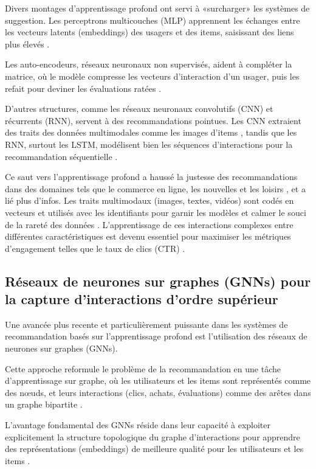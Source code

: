 Divers montages d'apprentissage profond ont servi à «surcharger» les systèmes de suggestion. Les perceptrons multicouches (MLP) apprennent les échanges entre les vecteurs latents (embeddings) des usagers et des items, saisissant des liens plus élevés \citet{He2017}.

Les auto-encodeurs, réseaux neuronaux non supervisés, aident à compléter la matrice, où le modèle compresse les vecteurs d'interaction d'un usager, puis les refait pour deviner les évaluations ratées \citep{Sedhain2015}.

D'autres structures, comme les réseaux neuronaux convolutifs (CNN) et récurrents (RNN), servent à des recommandations pointues. Les CNN extraient des traits des données multimodales comme les images d'items \citep{Wang2017a}, tandis que les RNN, surtout les LSTM, modélisent bien les séquences d'interactions pour la recommandation séquentielle \citep{Hidasi2016}. 

Ce saut vers l'apprentissage profond a haussé la justesse des recommandations dans des domaines tels que le commerce en ligne, les nouvelles et les loisirs \citep{Covington2016, Okura2017}, et a lié plus d'infos. Les traits multimodaux (images, textes, vidéos) sont codés en vecteurs et utilisés avec les identifiants pour garnir les modèles et calmer le souci de la rareté des données \citep{Zhang2017, Elkahky2015}. L'apprentissage de ces interactions complexes entre différentes caractéristiques est devenu essentiel pour maximiser les métriques d'engagement telles que le taux de clics (CTR) \citep{Guo2017}.
\subsection{Réseaux de neurones sur graphes (GNNs) pour la capture d'interactions d'ordre supérieur}

Une avancée plus recente et particulièrement puissante dans les systèmes de recommandation basés sur l'apprentissage profond est l'utilisation des réseaux de neurones sur graphes (GNNs).

Cette approche reformule le problème de la recommandation en une tâche d'apprentissage sur graphe, où les utilisateurs et les items sont représentés comme des nœuds, et leurs interactions (clics, achats, évaluations) comme des arêtes dans un graphe bipartite \citep{Ying2018, Wang2019}. 

L'avantage fondamental des GNNs réside dans leur capacité à exploiter explicitement la structure topologique du graphe d'interactions pour apprendre des représentations (embeddings) de meilleure qualité pour les utilisateurs et les items \citep{Wu2022}.


